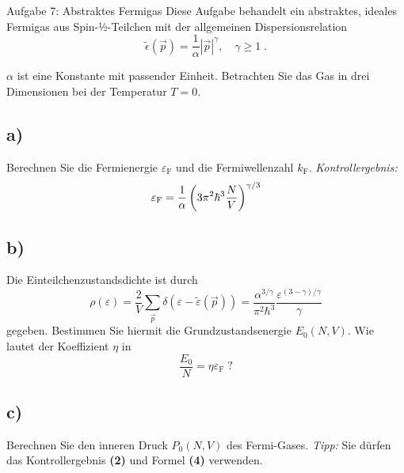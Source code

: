 \begin{aufgabe}{Aufgabe 7: Abstraktes Fermigas}
    Diese Aufgabe behandelt ein abstraktes, ideales Fermigas aus Spin-½-Teilchen mit der allgemeinen Dispersionsrelation
    \[
        \tilde\epsilon(\vec p) = \frac{1}{\alpha} |\vec p|^\gamma, \quad \gamma \geq 1 \;.
    \]

    $\alpha$ ist eine Konstante mit passender Einheit.
    Betrachten Sie das Gas in drei Dimensionen bei der Temperatur $T=0$.

    \subsection{a)}
    Berechnen Sie die Fermienergie $\varepsilon_\text{F}$ und die Fermiwellenzahl $k_\text{F}$.
    \textit{Kontrollergebnis:}
    \[
        \varepsilon_\text{F} = \frac{1}{\alpha}\left(3\pi^2\hbar^3\frac{N}{V}\right)^{\gamma/3}
    \]

    \subsection{b)}
    Die Einteilchenzustandsdichte ist durch
    \[
        \rho(\varepsilon) = \frac{2}{V} \sum_{\vec p}{\delta(\varepsilon - \tilde\varepsilon(\vec p))}
        = \frac{\alpha^{3/\gamma}}{\pi^2\hbar^3} \frac{\varepsilon^{(3-\gamma)/\gamma}}{\gamma}
    \]
    gegeben.
    Bestimmen Sie hiermit die Grundzustandsenergie $E_0(N, V)$.
    Wie lautet der Koeffizient $\eta$ in
    \[
        \frac{E_0}{N} = \eta\varepsilon_\text{F} \;\text{?}
    \]

    \subsection{c)}
    Berechnen Sie den inneren Druck $P_0(N, V)$ des Fermi-Gases.
    \textit{Tipp:} Sie dürfen das Kontrollergebnis \textbf{(2)} und Formel \textbf{(4)} verwenden.

\end{aufgabe}


